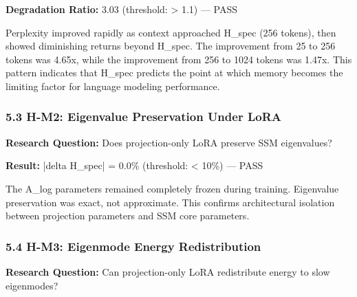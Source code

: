 \textbf{Degradation Ratio:} 3.03 (threshold: > 1.1) --- PASS

Perplexity improved rapidly as context approached H\_spec (256 tokens), then showed diminishing returns beyond H\_spec. The improvement from 25 to 256 tokens was 4.65x, while the improvement from 256 to 1024 tokens was 1.47x. This pattern indicates that H\_spec predicts the point at which memory becomes the limiting factor for language modeling performance.

\subsubsection{5.3 H-M2: Eigenvalue Preservation Under LoRA}

\textbf{Research Question:} Does projection-only LoRA preserve SSM eigenvalues?

\begin{table}[htbp]
\centering
{}
\end{table}

\textbf{Result:} |delta H\_spec| = 0.0\% (threshold: < 10\%) --- PASS

The A\_log parameters remained completely frozen during training. Eigenvalue preservation was exact, not approximate. This confirms architectural isolation between projection parameters and SSM core parameters.

\subsubsection{5.4 H-M3: Eigenmode Energy Redistribution}

\textbf{Research Question:} Can projection-only LoRA redistribute energy to slow eigenmodes?

\begin{table}[htbp]
\centering
{}
\end{table}


